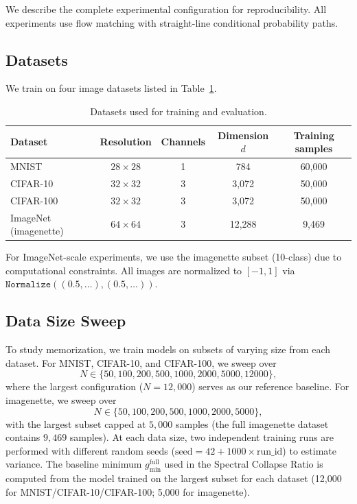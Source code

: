 \documentclass[11pt]{article}
\begin{document}
We describe the complete experimental configuration for reproducibility. All experiments use flow matching with straight-line conditional probability paths.

\subsection{Datasets}

We train on four image datasets listed in Table~\ref{tab:datasets}.

\begin{table}[htbp]
\centering
\caption{Datasets used for training and evaluation.}
\label{tab:datasets}
\begin{tabular}{@{}lcccc@{}}
\toprule
Dataset & Resolution & Channels & Dimension $d$ & Training samples \\
\midrule
MNIST & $28\times28$ & 1 & 784 & 60,000 \\
CIFAR-10 & $32\times32$ & 3 & 3,072 & 50,000 \\
CIFAR-100 & $32\times32$ & 3 & 3,072 & 50,000 \\
ImageNet (imagenette) & $64\times64$ & 3 & 12,288 & 9,469 \\
\bottomrule
\end{tabular}
\end{table}

For ImageNet-scale experiments, we use the imagenette subset (10-class) due to computational constraints. All images are normalized to $[-1, 1]$ via $\texttt{Normalize}((0.5,\ldots),(0.5,\ldots))$.

\subsection{Data Size Sweep}

To study memorization, we train models on subsets of varying size from each dataset. For MNIST, CIFAR-10, and CIFAR-100, we sweep over
\begin{equation}
N \in \{50, 100, 200, 500, 1000, 2000, 5000, 12000\},
\end{equation}
where the largest configuration ($N = 12,\!000$) serves as our reference baseline. For imagenette, we sweep over
\begin{equation}
N \in \{50, 100, 200, 500, 1000, 2000, 5000\},
\end{equation}
with the largest subset capped at $5,\!000$ samples (the full imagenette dataset contains $9,\!469$ samples). At each data size, two independent training runs are performed with different random seeds ($\text{seed} = 42 + 1000 \times \text{run\_id}$) to estimate variance. The baseline minimum $g_{\min}^{\text{full}}$ used in the Spectral Collapse Ratio is computed from the model trained on the largest subset for each dataset (12,000 for MNIST/CIFAR-10/CIFAR-100; 5,000 for imagenette).
\end{document}
